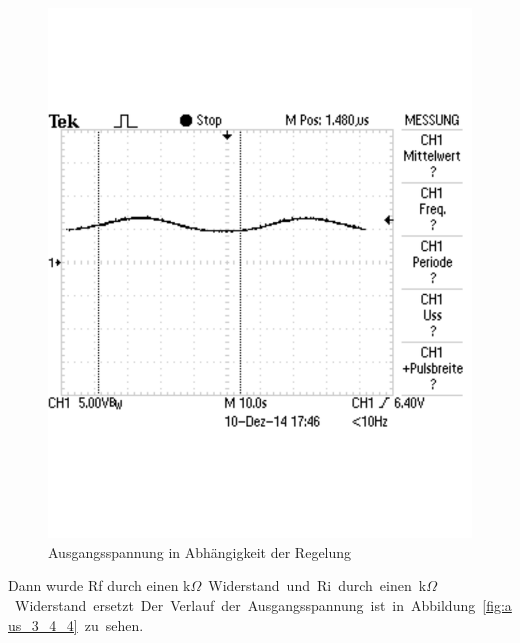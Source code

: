 \documentclass[12pt,a4paper]{article}
\begin{document}
\begin{figure}[H] 
  \centering
    \includegraphics[trim = 0mm 50mm 0mm 50mm, clip, scale = 0.6]{TEK0009.pdf}
  	\caption[Ausgangsspannung in Abhängigkeit der Regelung]{Ausgangsspannung in Abhängigkeit der Regelung}
  \label{fig:aus_3_4_3}
\end{figure}

Dann wurde Rf durch einen \unit[470]{k$\Omega$} Widerstand und Ri durch einen \unit[10]{k$\Omega$} Widerstand ersetzt. Der Verlauf der Ausgangsspannung ist in Abbildung \ref{fig:aus_3_4_4} zu sehen.
\end{document}
